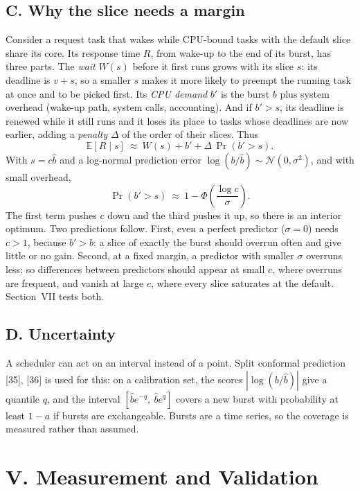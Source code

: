 \documentclass{article}
\begin{document}
\subsection*{C. Why the slice needs a margin}
Consider a request task that wakes while CPU-bound tasks with the default slice share its core. Its response time $R$, from wake-up to the end of its burst, has three parts. The \emph{wait} $W(s)$ before it first runs grows with its slice $s$: its deadline is $v+s$, so a smaller $s$ makes it more likely to preempt the running task at once and to be picked first. Its \emph{CPU demand} $b'$ is the burst $b$ plus system overhead (wake-up path, system calls, accounting). And if $b'>s$, its deadline is renewed while it still runs and it loses its place to tasks whose deadlines are now earlier, adding a \emph{penalty} $\Delta$ of the order of their slices. Thus
\begin{equation}
\mathbb{E}[R\mid s]\ \approx\ W(s)+b'+\Delta\,\Pr(b'>s).
\end{equation}
With $s=c\hat b$ and a log-normal prediction error $\log(b/\hat b)\sim\mathcal{N}(0,\sigma^2)$, and with small overhead,
\begin{equation}
\Pr(b'>s)\ \approx\ 1-\Phi\!\left(\frac{\log c}{\sigma}\right).
\end{equation}
The first term pushes $c$ down and the third pushes it up, so there is an interior optimum. Two predictions follow. First, even a perfect predictor ($\sigma=0$) needs $c>1$, because $b'>b$: a slice of exactly the burst should overrun often and give little or no gain. Second, at a fixed margin, a predictor with smaller $\sigma$ overruns less; so differences between predictors should appear at small $c$, where overruns are frequent, and vanish at large $c$, where every slice saturates at the default. Section~VII tests both.

\subsection*{D. Uncertainty}
A scheduler can act on an interval instead of a point. Split conformal prediction [35], [36] is used for this: on a calibration set, the scores $|\log(b/\hat b)|$ give a quantile $q$, and the interval $[\hat b e^{-q},\ \hat b e^{q}]$ covers a new burst with probability at least $1-a$ if bursts are exchangeable. Bursts are a time series, so the coverage is measured rather than assumed.

\section*{V. Measurement and Validation}
\end{document}
